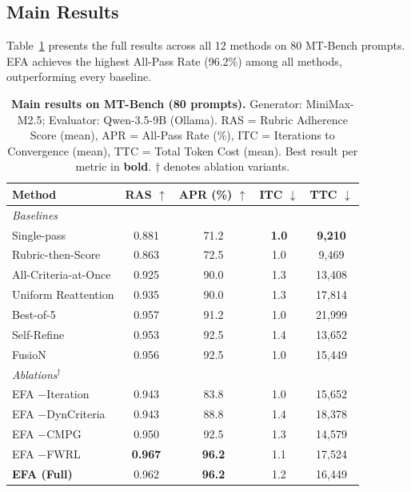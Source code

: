\documentclass[11pt]{article}
\newcommand{\efa}{\textsc{EFA}}  %
\newcommand{\cmpg}{\textsc{CMPG}}
\newcommand{\fwrl}{\textsc{FWRL}}
\begin{document}
\subsection{Main Results}

Table~\ref{tab:main_results} presents the full results across all 12 methods on 80 MT-Bench prompts. \efa{} achieves the highest All-Pass Rate (96.2\%) among all methods, outperforming every baseline.

\begin{table}[t]
\centering
\caption{\textbf{Main results on MT-Bench (80 prompts).} Generator: MiniMax-M2.5; Evaluator: Qwen-3.5-9B (Ollama). RAS = Rubric Adherence Score (mean), APR = All-Pass Rate (\%), ITC = Iterations to Convergence (mean), TTC = Total Token Cost (mean). Best result per metric in \textbf{bold}. $\dagger$ denotes ablation variants.}
\label{tab:main_results}
\small
\begin{tabular}{@{}lcccc@{}}
\toprule
\textbf{Method} & \textbf{RAS} $\uparrow$ & \textbf{APR (\%)} $\uparrow$ & \textbf{ITC} $\downarrow$ & \textbf{TTC} $\downarrow$ \\
\midrule
\multicolumn{5}{l}{\textit{Baselines}} \\
\quad Single-pass           & 0.881 & 71.2 & \textbf{1.0} & \textbf{9,210} \\
\quad Rubric-then-Score     & 0.863 & 72.5 & 1.0 & 9,469 \\
\quad All-Criteria-at-Once  & 0.925 & 90.0 & 1.3 & 13,408 \\
\quad Uniform Reattention   & 0.935 & 90.0 & 1.3 & 17,814 \\
\quad Best-of-5             & 0.957 & 91.2 & 1.0 & 21,999 \\
\quad Self-Refine           & 0.953 & 92.5 & 1.4 & 13,652 \\
\quad FusioN                & 0.956 & 92.5 & 1.0 & 15,449 \\
\midrule
\multicolumn{5}{l}{\textit{Ablations}$^\dagger$} \\
\quad EFA $-$Iteration      & 0.943 & 83.8 & 1.0 & 15,652 \\
\quad EFA $-$DynCriteria    & 0.943 & 88.8 & 1.4 & 18,378 \\
\quad EFA $-$\cmpg{}        & 0.950 & 92.5 & 1.3 & 14,579 \\
\quad EFA $-$\fwrl{}        & \textbf{0.967} & \textbf{96.2} & 1.1 & 17,524 \\
\midrule
\textbf{\efa{} (Full)}      & 0.962 & \textbf{96.2} & 1.2 & 16,449 \\
\bottomrule
\end{tabular}
\end{table}
\end{document}
